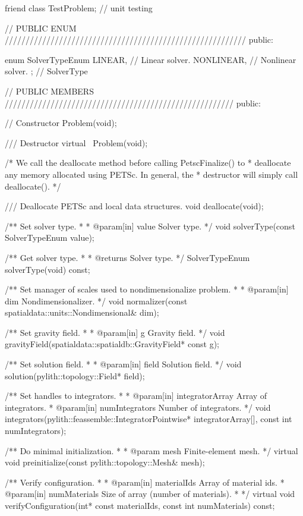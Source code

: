 \begin{cplusplus}
{  friend class TestProblem;   // unit testing

    // PUBLIC ENUM //////////////////////////////////////////////////////////
public:

    enum SolverTypeEnum {
        LINEAR, // Linear solver.
        NONLINEAR, // Nonlinear solver.
    };   // SolverType


    // PUBLIC MEMBERS ///////////////////////////////////////////////////////
public:

    // Constructor
    Problem(void);

    /// Destructor
    virtual ~Problem(void);

    /* We call the deallocate method before calling PetscFinalize() to
     * deallocate any memory allocated using PETSc. In general, the
     * destructor will simply call deallocate().
     */
    
    /// Deallocate PETSc and local data structures.
    void deallocate(void);

    /** Set solver type.
     *
     * @param[in] value Solver type.
     */
    void solverType(const SolverTypeEnum value);

    /** Get solver type.
     *
     * @returns Solver type.
     */
    SolverTypeEnum solverType(void) const;

    /** Set manager of scales used to nondimensionalize problem.
     *
     * @param[in] dim Nondimensionalizer.
     */
    void normalizer(const spatialdata::units::Nondimensional& dim);

    /** Set gravity field.
     *
     * @param[in] g Gravity field.
     */
    void gravityField(spatialdata::spatialdb::GravityField* const g);

    /** Set solution field.
     *
     * @param[in] field Solution field.
     */
    void solution(pylith::topology::Field* field);

    /** Set handles to integrators.
     *
     * @param[in] integratorArray Array of integrators.
     * @param[in] numIntegrators Number of integrators.
     */
    void integrators(pylith::feassemble::IntegratorPointwise* integratorArray[],
                     const int numIntegrators);

    /** Do minimal initialization.
     *
     * @param mesh Finite-element mesh.
     */
    virtual
    void preinitialize(const pylith::topology::Mesh& mesh);

    /** Verify configuration.
     *
     * @param[in] materialIds Array of material ids.
     * @param[in] numMaterials Size of array (number of materials).
     *
     */
    virtual
    void verifyConfiguration(int* const materialIds,
                             const int numMaterials) const;

}
\end{cplusplus}
